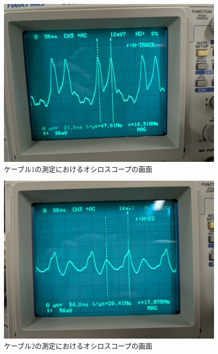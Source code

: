 \documentclass{jarticle}
\begin{document}
\begin{figure}[H]
  \begin{center}
    \includegraphics[scale=0.3]{cable1_result_picture.jpg}
    \caption{ケーブル1の測定におけるオシロスコープの画面}
    \label{fg:cable1}
  \end{center}
\end{figure}

\begin{figure}[H]
  \begin{center}
    \includegraphics[scale=0.3]{cable2_result_picture.jpg}
    \caption{ケーブル2の測定におけるオシロスコープの画面}
    \label{fg:cable2}
  \end{center}
\end{figure}
\end{document}
